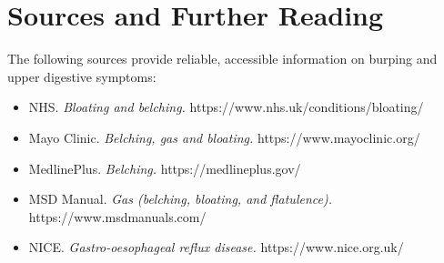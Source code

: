 \section*{Sources and Further Reading}
The following sources provide reliable, accessible information on burping and upper digestive symptoms:
\begin{itemize}
    \item NHS. \textit{Bloating and belching.} https://www.nhs.uk/conditions/bloating/
    \item Mayo Clinic. \textit{Belching, gas and bloating.} https://www.mayoclinic.org/
    \item MedlinePlus. \textit{Belching.} https://medlineplus.gov/
    \item MSD Manual. \textit{Gas (belching, bloating, and flatulence).} https://www.msdmanuals.com/
    \item NICE. \textit{Gastro-oesophageal reflux disease.} https://www.nice.org.uk/
\end{itemize}
